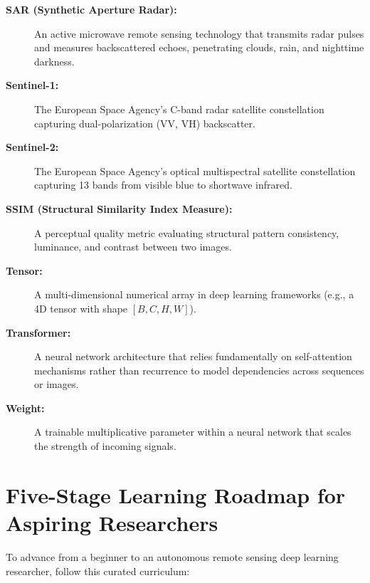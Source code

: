 \begin{description}
    \item[\textbf{SAR (Synthetic Aperture Radar):}] An active microwave remote sensing technology that transmits radar pulses and measures backscattered echoes, penetrating clouds, rain, and nighttime darkness.
    \item[\textbf{Sentinel-1:}] The European Space Agency's C-band radar satellite constellation capturing dual-polarization (VV, VH) backscatter.
    \item[\textbf{Sentinel-2:}] The European Space Agency's optical multispectral satellite constellation capturing 13 bands from visible blue to shortwave infrared.
    \item[\textbf{SSIM (Structural Similarity Index Measure):}] A perceptual quality metric evaluating structural pattern consistency, luminance, and contrast between two images.
    \item[\textbf{Tensor:}] A multi-dimensional numerical array in deep learning frameworks (e.g., a 4D tensor with shape $[B, C, H, W]$).
    \item[\textbf{Transformer:}] A neural network architecture that relies fundamentally on self-attention mechanisms rather than recurrence to model dependencies across sequences or images.
    \item[\textbf{Weight:}] A trainable multiplicative parameter within a neural network that scales the strength of incoming signals.
\end{description}

\section{Five-Stage Learning Roadmap for Aspiring Researchers}
To advance from a beginner to an autonomous remote sensing deep learning researcher, follow this curated curriculum:

